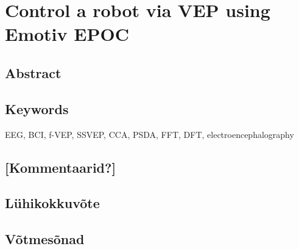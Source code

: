 
\chapter*{Control a robot via VEP using Emotiv EPOC}
\section*{Abstract}
\section*{Keywords}
\normalsize{EEG, BCI, f-VEP, SSVEP, CCA, PSDA, FFT, DFT, electroencephalography}
\section*{[Kommentaarid?]}
\section*{Lühikokkuvõte}
\section*{Võtmesõnad}